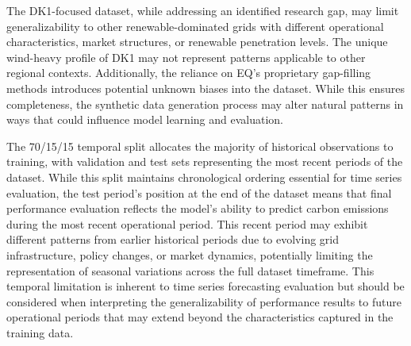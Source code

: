 The DK1-focused dataset, while addressing an identified research gap, may limit generalizability to other renewable-dominated grids with different operational characteristics, market structures, or renewable penetration levels. The unique wind-heavy profile of DK1 may not represent patterns applicable to other regional contexts. Additionally, the reliance on EQ's proprietary gap-filling methods introduces potential unknown biases into the dataset. While this ensures completeness, the synthetic data generation process may alter natural patterns in ways that could influence model learning and evaluation.

The 70/15/15 temporal split allocates the majority of historical observations to training, with validation and test sets representing the most recent periods of the dataset. While this split maintains chronological ordering essential for time series evaluation, the test period's position at the end of the dataset means that final performance evaluation reflects the model's ability to predict carbon emissions during the most recent operational period. This recent period may exhibit different patterns from earlier historical periods due to evolving grid infrastructure, policy changes, or market dynamics, potentially limiting the representation of seasonal variations across the full dataset timeframe. This temporal limitation is inherent to time series forecasting evaluation but should be considered when interpreting the generalizability of performance results to future operational periods that may extend beyond the characteristics captured in the training data.
